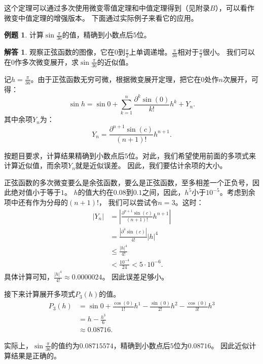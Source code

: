 \documentclass[12pt,UTF8]{ctexbook}
\theoremstyle{definition}
\newtheorem{et}{例题}[section]
\newtheorem*{so}{解答}
\theoremstyle{plain}
\begin{document}
这个定理可以通过多次使用微变零值定理和中值定理得到（见附录$B$），可以看作微变中值定理的增强版本。
下面通过实际例子来看它的应用。

\begin{et}
    计算$\sin{\frac{\pi}{36}}$的值，精确到小数点后$5$位。
\end{et}

\begin{so}
    观察正弦函数的图像，它在$0$到$\frac{\pi}{2}$上单调递增。$\frac{\pi}{36}$相对于$\frac{\pi}{2}$很小。
    我们可以在$0$作多次微变展开，求$\sin{\frac{\pi}{36}}$的近似值。

    记$h = \frac{\pi}{36}$。由于正弦函数无穷可微，根据微变展开定理，把它在$0$处作$n$次展开，可得：
    $$ \sin{h} = \sin{0} + \sum_{k=1}^n \frac{\partial^k \sin (0)}{k!}h^k + Y_n. $$
    其中余项$Y_n$为：
    $$ Y_n = \frac{\partial^{n+1} \sin (c)}{(n+1)!}h^{n+1}. $$

    按题目要求，计算结果精确到小数点后$5$位。对此，我们希望使用前面的多项式来计算近似值，而余项$Y_n$就是近似误差。
    因此，我们要估计余项的大小。
    
    正弦函数的多次微变要么是余弦函数，要么是正弦函数，至多相差一个正负号，因此绝对值小于等于$1$。
    $h$的值大约在$0.08$到$0.1$之间，因此，$h^5$小于$10^{-5}$。考虑到余项中还有作为分母的$(n+1)!$，
    我们可以尝试令$n=3$。这时：
    \begin{align*}
        | Y_n| &= \left|\frac{\partial^{n+1} \sin (c)}{(n+1)!}h^{n+1}\right|  \\
        &= \frac{\left|\partial^{4} \sin (c)\right|}{4!}|h|^4  \\
        &\leqslant \frac{|h|^4}{4!}  \\
        &< \frac{10^{-4}}{24} < 5 \cdot 10^{-6}. 
    \end{align*}
    具体计算可知，$\frac{|h|^4}{4!} \approx 0.0000024$。
    因此误差足够小。


    接下来计算展开多项式$P_3(h)$的值。
    \begin{align*}
        P_3(h) &= \sin{0} + \frac{\cos (0)}{1!}h^1 - \frac{\sin (0)}{2!}h^2 - \frac{\cos (0)}{3!}h^3  \\
        &= h - \frac{h^3}{6}  \\
        &\approx 0.08716. 
    \end{align*}
    
    实际上，$\sin{\frac{\pi}{36}}$的值约为$0.08715574$，精确到小数点后$5$位为$0.08716$。
    因此近似计算结果是正确的。
\end{so}
\end{document}
